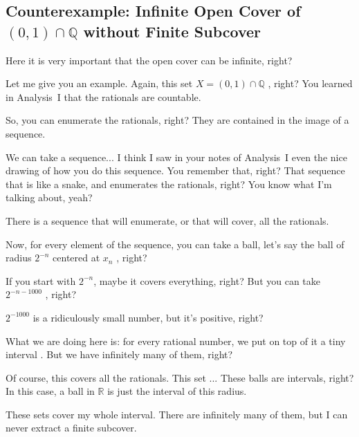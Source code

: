 \subsection{Counterexample: Infinite Open Cover of \texorpdfstring{$(0, 1) \cap \mathbb{Q}$}{(0, 1) cap Q} without Finite Subcover}

\begin{speech}[01:01:19 - 01:02:26]
Here it is very important that the open cover can be infinite, right?

Let me give you an example. Again, this set $X = (0, 1) \cap \mathbb{Q}$ , right? You learned in Analysis~I that the rationals are countable.

So, you can enumerate the rationals, right?  They are contained in the image of a sequence.

We can take a sequence... I think I saw in your notes of Analysis~I even the nice drawing of how you do this sequence. You remember that, right?  That sequence that is like a snake, and enumerates the rationals, right? You know what I'm talking about, yeah?

There is a sequence that will enumerate, or that will cover, all the rationals.
\end{speech}

\begin{speech}[01:02:26 - 01:03:58]
Now, for every element of the sequence, you can take a ball, let's say the ball of radius $2^{-n}$ centered at $x_n$ , right?

If you start with $2^{-n}$, maybe it covers everything, right? But you can take $2^{-n - 1000}$ , right?

$2^{-1000}$ is a ridiculously small number, but it's positive, right?

What we are doing here is: for every rational number, we put on top of it a tiny interval . But we have infinitely many of them, right?

Of course, this covers all the rationals. This set ... These balls are intervals, right? In this case, a ball in $\mathbb{R}$ is just the interval of this radius.

These sets cover my whole interval. There are infinitely many of them, but I can never extract a finite subcover.
\end{speech}

